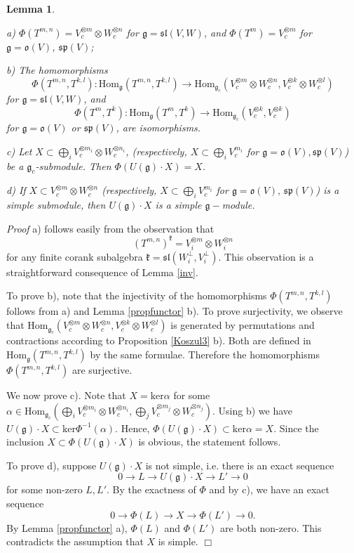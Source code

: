 \documentclass{svmult}
\newtheorem{lem}[theo]{Lemma}
\renewenvironment{proof}{ \emph{Proof}}{$\Box$}
\renewcommand{\sp}{\mathfrak{sp}}
\renewcommand{\sl}{\mathfrak{sl}}
\newcommand{\kk}{\mathfrak{k}}
\newcommand{\oo}{\mathfrak{o}}
\renewcommand{\gg}{\mathfrak{g}}
\newcommand{\Ker}{\mathrm{ker}}
\newcommand{\Hom}{\mathrm{Hom}}
\begin{document}
\begin{lem}\label{tensorfunctor} 

a) $\Phi(T^{m,n})=V_c^{\otimes m}\otimes W_c^{\otimes n}$ for $\gg =
\sl(V,W)$, and 
$\Phi(T^m)=V_c^{\otimes m}$ for $\gg=\oo(V)$, $\sp(V)$;

b) The homomorphisms 
$$\Phi(T^{m,n},T^{k,l}):\Hom_\gg(T^{m,n},T^{k,l})\to \Hom_{\gg_c}(V_c^{\otimes m}\otimes W_c^{\otimes n},V_c^{\otimes k}\otimes W_c^{\otimes l})$$ 
for $\gg=\sl(V,W)$, and
$$\Phi(T^m,T^k):\Hom_\gg(T^m,T^k)\to \Hom_{\gg_c}(V_c^{\otimes k},V_c^{\otimes k})$$
for  $\gg=\oo(V)$ or $\sp(V)$, are isomorphisms.

c) Let $X\subset \bigoplus_i V_c^{\otimes m_i}\otimes W_c^{\otimes  n_i}$, 
(respectively, $X \subset \bigoplus_i V_c^{m_i}$ for $\gg = \oo(V),\sp(V)$) be a $\gg_c$-submodule. Then $\Phi(U(\gg)\cdot X)=X$.

d) If  $X\subset V_c^{\otimes m}\otimes W_c^{\otimes n}$ (respectively, $X \subset \bigoplus_i V_c^{m_i}$ for $\gg = \oo(V),\,\sp(V)$) is a simple submodule, then $U(\gg)\cdot X$ is a simple $\gg-$module.
\end{lem}
\begin{proof} a) follows easily from the observation that
$$(T^{m,n})^{\kk}=V_i^{\otimes m}\otimes W_i^{\otimes n}$$ for any finite corank subalgebra $\kk=\sl(W_i^\perp,V_i^\perp)$. This observation is a straightforward consequence of Lemma \ref{inv}.

To prove b), note that the injectivity of the homomorphisms $\Phi(T^{m,n},T^{k,l})$ follows from a) and Lemma \ref{propfunctor} b). To prove surjectivity, we observe that
$\Hom_{\gg_c}(V_c^{\otimes m}\otimes W_c^{\otimes n},V_c^{\otimes k}\otimes W_c^{\otimes l})$ is generated by permutations and contractions according to Proposition \ref{Koszul3} b). Both are defined in $\Hom_\gg(T^{m,n},T^{k,l})$ by the same formulae. Therefore the homomorphisms $\Phi(T^{m,n}, T^{k,l})$ are surjective.  

We now prove c). Note that $X=\Ker \alpha$ for some 
$\alpha\in\Hom_{\gg_c}( \bigoplus_i V_c^{\otimes m_i}\otimes W_c^{\otimes n_i}, \bigoplus_j V_c^{\otimes m_j}\otimes W_c^{\otimes n_j})$.
Using b) we have $U(\gg)\cdot X\subset\Ker \Phi^{-1}(\alpha)$. Hence, $\Phi(U(\gg)\cdot X)\subset\Ker\alpha=X$. Since the inclusion $X\subset\Phi(U(\gg)\cdot X)$ is obvious,
the statement follows.

To prove d), suppose $U(\gg)\cdot X$ is not simple, i.e. there is an exact sequence
$$0\to L\to U(\gg)\cdot X\to L'\to 0$$
for some non-zero $L,L'$. By the exactness of $\Phi$ and by c), we have an exact sequence
$$0\to \Phi(L)\to X\to \Phi(L')\to 0.$$
By Lemma \ref{propfunctor} a), $\Phi(L)$ and $\Phi(L')$ are both non-zero. This contradicts the assumption that $X$ is simple.
\end{proof}
\end{document}
